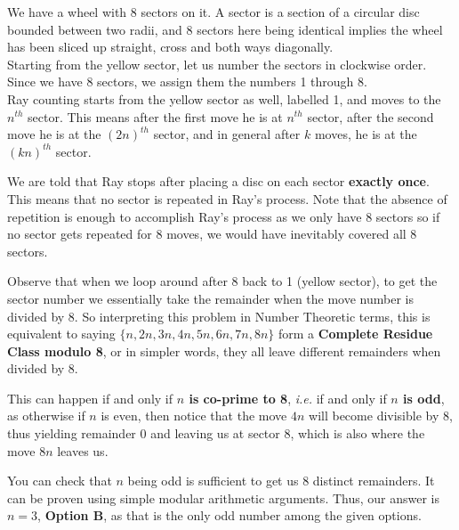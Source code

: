 We have a wheel with 8 sectors on it. A sector is a section of a circular disc bounded between two radii, and 8 sectors here being identical implies the wheel has been sliced up straight, cross and both ways diagonally.
\\
Starting from the yellow sector, let us number the sectors in clockwise order. Since we have 8 sectors, we assign them the numbers 1 through 8.
\\
Ray counting starts from the yellow sector as well, labelled 1, and moves to the \(n^{th}\) sector. This means after the first move he is at \(n^{th}\) sector, after the second move he is at the \((2n)^{th}\) sector, and in general after \(k\) moves, he is at the \((kn)^{th}\) sector.

We are told that Ray stops after placing a disc on each sector \textbf{exactly once}. This means that no sector is repeated in Ray's process. Note that the absence of repetition is enough to accomplish Ray's process as we only have 8 sectors so if no sector gets repeated for 8 moves, we would have inevitably covered all 8 sectors.

Observe that when we loop around after 8 back to 1 (yellow sector), to get the sector number we essentially take the remainder when the move number is divided by 8. So interpreting this problem in Number Theoretic terms, this is equivalent to saying \(\{n, 2n, 3n, 4n, 5n, 6n, 7n, 8n\}\) form a \textbf{Complete Residue Class modulo 8}, or in simpler words, they all leave different remainders when divided by 8.

This can happen if and only if \textbf{\(n\) is co-prime to 8}, \textit{i.e.} if and only if \textbf{\(n\) is odd}, as otherwise if \(n\) is even, then notice that the move \(4n\) will become divisible by 8, thus yielding remainder 0 and leaving us at sector 8, which is also where the move \(8n\) leaves us.

You can check that \(n\) being odd is sufficient to get us 8 distinct remainders. It can be proven using simple modular arithmetic arguments. Thus, our answer is \(n=3\), \textbf{Option B}, as that is the only odd number among the given options.
